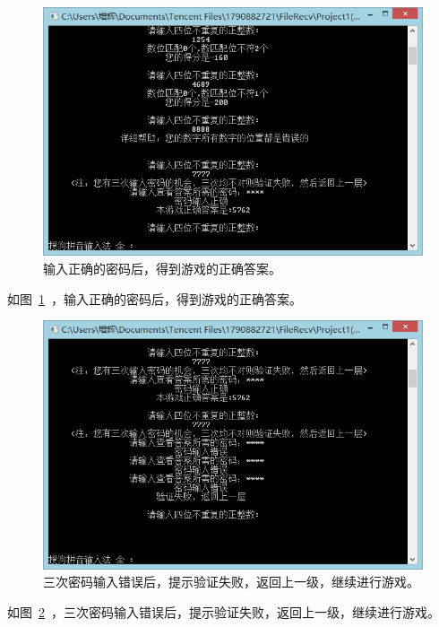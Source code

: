 \begin{figure}[htp]
\includegraphics[width=\textwidth]{image/27.png}
\caption{\label{p7}输入正确的密码后，得到游戏的正确答案。}
\end{figure}
 
如图~\ref{p7}~，输入正确的密码后，得到游戏的正确答案。

\begin{figure}[htp]
\includegraphics[width=\textwidth]{image/28.png}
\caption{\label{p8}三次密码输入错误后，提示验证失败，返回上一级，继续进行游戏。}
\end{figure}
 
如图~\ref{p8}~，三次密码输入错误后，提示验证失败，返回上一级，继续进行游戏。

